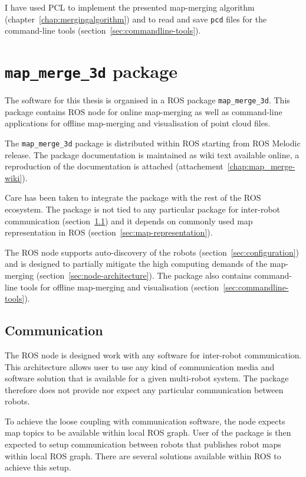 I have used \gls{PCL} to implement the presented map-merging algorithm (chapter~\ref{chap:mergingalgorithm}) and to read and save \texttt{pcd} files for the command-line tools (section~\ref{sec:commandline-tools}).


\section{\texttt{map\_merge\_3d} package}
\label{sec:ros-package}

The software for this thesis is organised in a \gls{ROS} package \texttt{map\_merge\_3d}. This package contains \gls{ROS} node for online map-merging as well as command-line applications for offline map-merging and visualisation of point cloud files.

The \texttt{map\_merge\_3d} package is distributed within \gls{ROS} starting from \gls{ROS} Melodic release. The package documentation is maintained as wiki text available online, a reproduction of the documentation is attached (attachement~\ref{chap:map_merge-wiki}).

Care has been taken to integrate the package with the rest of the \gls{ROS} ecosystem. The package is not tied to any particular package for inter-robot communication (section~\ref{sec:communication}) and it depends on commonly used map representation in \gls{ROS} (section~\ref{sec:map-representation}).

The \gls{ROS} node supports auto-discovery of the robots (section~\ref{sec:configuration}) and is designed to partially mitigate the high computing demands of the map-merging (section~\ref{sec:node-architecture}). The package also contains command-line tools for offline map-merging and visualisation (section~\ref{sec:commandline-tools}).

\subsection{Communication}
\label{sec:communication}

The \gls{ROS} node is designed work with any software for inter-robot communication. This architecture allows user to use any kind of communication media and software solution that is available for a given multi-robot system. The package therefore does not provide nor expect any particular communication between robots.

To achieve the loose coupling with communication software, the node expects map topics to be available within local \gls{ROS} graph. User of the package is then expected to setup communication between robots that publishes robot maps within local \gls{ROS} graph. There are several solutions available within \gls{ROS} to achieve this setup.


